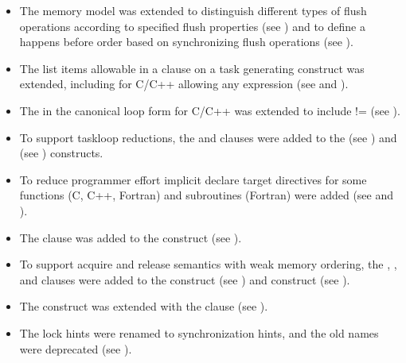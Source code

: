 \begin{itemize}
\item The memory model was extended to distinguish different types of flush
    operations according to specified flush properties (see
    ) and to define a happens before order
    based on synchronizing flush operations (see ).

\item The list items allowable in a  clause on a task generating
      construct was extended, including for C/C++ allowing any  expression (see
       and ).

\item The  in the canonical loop form for C/C++ was
extended to include != (see ).
  
\item To support taskloop reductions, the  and
 clauses were added to the  (see
) and  (see
) constructs.

\item To reduce programmer effort implicit declare target directives for
some functions (C, C++, Fortran) and subroutines (Fortran) were added (see
 and ).

\item The  clause was added to the  construct (see
).

\item To support acquire and release semantics with weak memory ordering, the
    , , and  clauses were added to
    the  construct (see ) and
     construct (see ).

\item The  construct was extended with the  clause (see ).

\item The lock hints were renamed to synchronization hints, and the
  old names were deprecated (see ).


\end{itemize}
